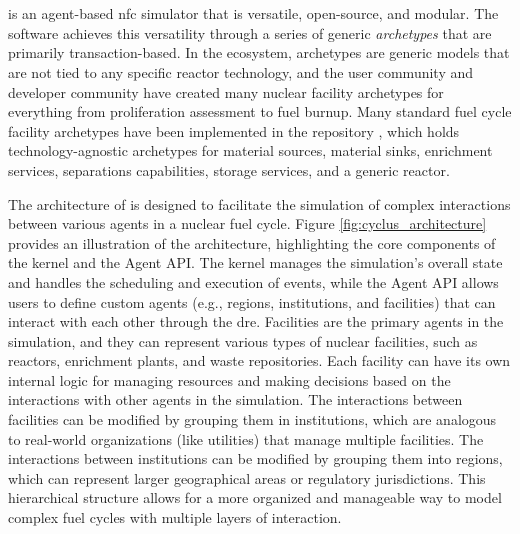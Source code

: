 \section{\cyclus}
\label{sec:cyclus}
\cyclus \cite{huff_cyclus_intro_2016} is an agent-based \gls{nfc} simulator that is versatile, open-source, and modular. The software achieves this versatility through a series of generic \textit{archetypes} that are primarily transaction-based. In the \cyclus ecosystem, archetypes are generic models that are not tied to any specific reactor technology, and the user community and developer community have created many nuclear facility archetypes for everything from proliferation assessment to fuel burnup. Many standard fuel cycle facility archetypes have been implemented in the \cycamore repository \cite{Carlsen_cycamore_2014}, which holds technology-agnostic archetypes for material sources, material sinks, enrichment services, separations capabilities, storage services, and a generic reactor.

The architecture of \cyclus is designed to facilitate the simulation of complex interactions between various agents in a nuclear fuel cycle. Figure \ref{fig:cyclus_architecture} provides an illustration of the architecture, highlighting the core components of the \cyclus kernel and the Agent API. The kernel manages the simulation's overall state and handles the scheduling and execution of events, while the Agent API allows users to define custom agents (e.g., regions, institutions, and facilities) that can interact with each other through the \gls{dre}. Facilities are the primary agents in the simulation, and they can represent various types of nuclear facilities, such as reactors, enrichment plants, and waste repositories. Each facility can have its own internal logic for managing resources and making decisions based on the interactions with other agents in the simulation. The interactions between facilities can be modified by grouping them in institutions, which are analogous to real-world organizations (like utilities) that manage multiple facilities. The interactions between institutions can be modified by grouping them into regions, which can represent larger geographical areas or regulatory jurisdictions. This hierarchical structure allows for a more organized and manageable way to model complex fuel cycles with multiple layers of interaction.

